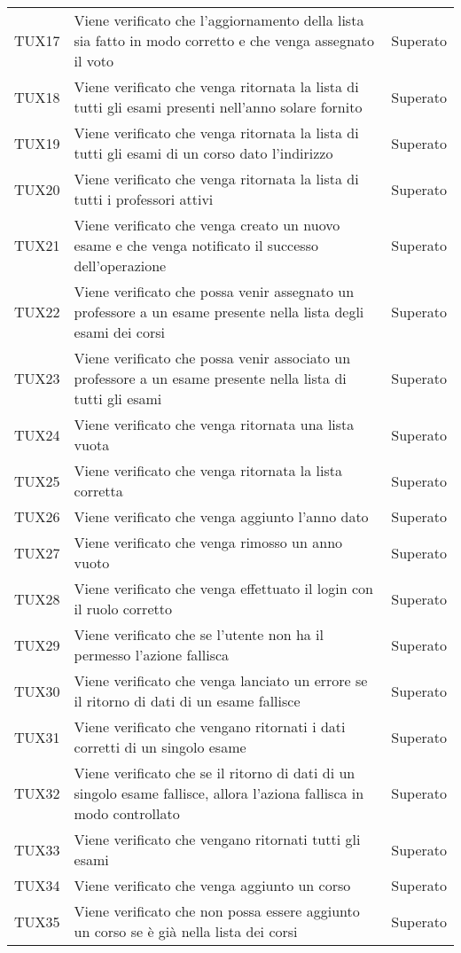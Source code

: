 \documentclass[PianoDiQualifica.tex]{subfiles}
\begin{document}
\begin{longtable}[H]{P{2cm}P{8.5cm}P{3cm}}
	TUX17 & Viene verificato che l'aggiornamento della lista sia fatto in modo corretto e che venga assegnato il voto & Superato \\
	TUX18 & Viene verificato che venga ritornata la lista di tutti gli esami presenti nell'anno solare fornito & Superato \\
	TUX19 & Viene verificato che venga ritornata la lista di tutti gli esami di un corso dato l'indirizzo & Superato \\
	TUX20 & Viene verificato che venga ritornata la lista di tutti i professori attivi & Superato \\
	TUX21 & Viene verificato che venga creato un nuovo esame e che venga notificato il successo dell'operazione & Superato \\
	TUX22 & Viene verificato che possa venir assegnato un professore a un esame presente nella lista degli esami dei corsi & Superato \\
	TUX23 & Viene verificato che possa venir associato un professore a un esame presente nella lista di tutti gli esami & Superato \\
	TUX24 & Viene verificato che venga ritornata una lista vuota & Superato \\
	TUX25 & Viene verificato che venga ritornata la lista corretta & Superato \\
	TUX26 & Viene verificato che venga aggiunto l'anno dato & Superato \\
	TUX27 & Viene verificato che venga rimosso un anno vuoto & Superato \\
	TUX28 & Viene verificato che venga effettuato il login con il ruolo corretto & Superato \\
	TUX29 & Viene verificato che se l'utente non ha il permesso l'azione fallisca & Superato \\
	TUX30 & Viene verificato che venga lanciato un errore se il ritorno di dati di un esame fallisce & Superato \\
	TUX31 & Viene verificato che vengano ritornati i dati corretti di un singolo esame & Superato \\
	TUX32 & Viene verificato che se il ritorno di dati di un singolo esame fallisce, allora l'aziona fallisca in modo controllato & Superato \\
	TUX33 & Viene verificato che vengano ritornati tutti gli esami & Superato \\
	TUX34 & Viene verificato che venga aggiunto un corso & Superato \\
	TUX35 & Viene verificato che non possa essere aggiunto un corso se è già nella lista dei corsi & Superato \\

\end{longtable}
\end{document}
